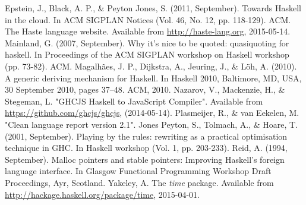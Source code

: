 \documentclass[preprint]{sigplanconf}
\begin{document}
\begin{thebibliography}{}
  Epstein, J., Black, A. P., \& Peyton Jones, S. (2011, September).
  Towards Haskell in the cloud.
  In ACM SIGPLAN Notices (Vol. 46, No. 12, pp. 118-129). ACM.
  The Haste language website.
  Available from \url{http://haste-lang.org}, 2015-05-14.
  Mainland, G. (2007, September).
  Why it's nice to be quoted: quasiquoting for haskell.
  In Proceedings of the ACM SIGPLAN workshop on Haskell workshop (pp. 73-82).
  ACM.
  Magalhães, J. P., Dijkstra, A., Jeuring, J., \& Löh, A. (2010).
  A generic deriving mechanism for Haskell.
  In Haskell 2010, Baltimore, MD, USA, 30 September 2010, pages 37–48. ACM, 2010.
  Nazarov, V., Mackenzie, H., \& Stegeman, L.
  "GHCJS Haskell to JavaScript Compiler".
  Available from \url{https://github.com/ghcjs/ghcjs}, (2014-05-14).
  Plasmeijer, R., \& van Eekelen, M.
  "Clean language report version 2.1".
  Jones Peyton, S., Tolmach, A., \& Hoare, T. (2001, September).
  Playing by the rules: rewriting as a practical optimisation technique in GHC.
  In Haskell workshop (Vol. 1, pp. 203-233).
  Reid, A. (1994, September).
  Malloc pointers and stable pointers: Improving Haskell's foreign language
  interface.
  In Glasgow Functional Programming Workshop Draft Proceedings, Ayr, Scotland.
  Yakeley, A.
  The \emph{time} package.
  Available from \url{http://hackage.haskell.org/package/time}, 2015-04-01.
\end{thebibliography}
\end{document}
